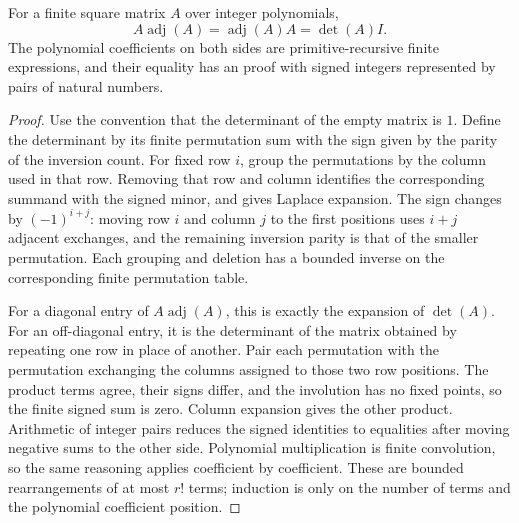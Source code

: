 \begin{lemma}\label{count:adjugate}
For a finite square matrix $A$ over integer polynomials,
\[
 A\operatorname{adj}(A)=\operatorname{adj}(A)A=\det(A)I.
\]
The polynomial coefficients on both sides are primitive-recursive finite
expressions, and their equality has an \ipra{} proof with signed integers
represented by pairs of natural numbers.
\end{lemma}
\begin{proof}
Use the convention that the determinant of the empty matrix is $1$.
Define the determinant by its finite permutation sum with the sign given
by the parity of the inversion count. For fixed row $i$, group the
permutations by the column used in that row. Removing that row and column
identifies the corresponding summand with the signed minor, and gives
Laplace expansion. The sign changes by $(-1)^{i+j}$: moving row $i$ and
column $j$ to the first positions uses $i+j$ adjacent exchanges, and
the remaining inversion parity is that of the smaller permutation.
Each grouping and deletion has a bounded inverse on the corresponding
finite permutation table.

For a diagonal entry of $A\operatorname{adj}(A)$, this is exactly the
expansion of $\det(A)$. For an off-diagonal entry, it is the determinant
of the matrix obtained by repeating one row in place of another. Pair
each permutation with the permutation exchanging the columns assigned
to those two row positions. The product terms agree, their signs differ,
and the involution has no fixed points, so the finite signed sum is zero.
Column expansion gives the other product. Arithmetic of integer pairs
reduces the signed identities to equalities after moving negative sums
to the other side. Polynomial multiplication is finite convolution,
so the same reasoning applies coefficient by coefficient. These are
bounded rearrangements of at most $r!$ terms; induction is only on the
number of terms and the polynomial coefficient position.
\end{proof}


